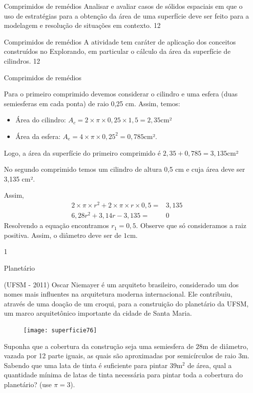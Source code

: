 \clearmargin

\begin{objectives}{Comprimidos de remédios}
{
  Analisar e avaliar casos de sólidos espaciais em que o uso de estratégias para a obtenção da área de uma superfície deve ser feito para a modelagem e resolução de situações em contexto.
}{1}{2}
\end{objectives}
\begin{sugestions}{Comprimidos de remédios}
{
  A atividade tem caráter de aplicação dos conceitos construídos no Explorando, em particular o cálculo da área da superfície de cilindros.
}{1}{2}
\end{sugestions}
\begin{answer}{Comprimidos de remédios}
{
  Para o primeiro comprimido devemos considerar o cilindro e uma esfera (duas semiesferas em cada ponta) de raio 0,25 cm. Assim, temos:

\begin{itemize}
\item Área do cilindro:  $A_c=2\times\pi\times0{,}25\times1{,}5=2{,}35$cm²
\item Área da esfera: $A_e=4\times\pi\times0{,}25^2=0{,}785$cm².
\end{itemize}
Logo, a área da superfície do primeiro comprimido é $2,35+0,785=3,135$cm²

No segundo comprimido temos um cilindro de altura 0,5 cm e cuja área deve ser 3,135 cm².

Assim,      
\begin{align*}
2\times\pi\times r^2+2\times\pi\times r\times0{,}5=&3{,}135\\
6{,}28 r^2+3{,}14 r-3{,}135=&0
\end{align*}
Resolvendo a equação encontramos $r_1=0{,}5$. Observe que só consideramos a raiz positiva.
Assim, o diâmetro deve ser de $1$cm.
}{1}
\end{answer}

\begin{task}{Planetário}

(UFSM - 2011) Oscar Niemayer é um arquiteto brasileiro, considerado um dos nomes mais influentes na arquitetura moderna internacional. Ele contribuiu, através de uma doação de um croqui, para a construição do planetário da UFSM, um marco arquitetônico importante da cidade de Santa Maria.

\begin{figure}[H]
\centering

\texttt{[image: superficie76]}

\end{figure}

Suponha que a cobertura da construção seja uma semiesfera de $28$m de diâmetro, vazada por 12 parte iguais, as quais são aproximadas por semicírculos de raio $3$m. Sabendo que uma lata de tinta é suficiente para pintar $39\text{m}^2$ de área, qual a quantidade mínima de latas de tinta necessária para pintar toda a cobertura do planetário? (use $\pi=3$).

\end{task}

